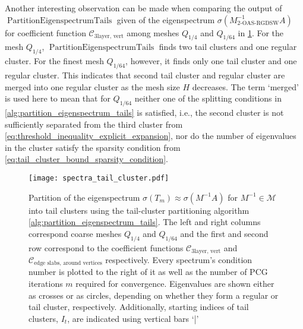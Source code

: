 Another interesting observation can be made when comparing the output of $\operatorname{PartitionEigenspectrumTails}$ given of the eigenspectrum $\sigma(M_{\text{2-OAS-RGDSW}}^{-1}A)$ for coefficient function $\mathcal{C}_{\text{3layer, vert}}$ among meshes $Q_{1/4}$ and $Q_{1/64}$ in \cref{fig:partitioning_eigenspectrum_tails}. For the mesh $Q_{1/4}$, $\operatorname{PartitionEigenspectrumTails}$ finds two tail clusters and one regular cluster. For the finest mesh $Q_{1/64}$, however, it finds only one tail cluster and one regular cluster. This indicates that second tail cluster and regular cluster are merged into one regular cluster as the mesh size $H$ decreases. The term `merged' is used here to mean that for $Q_{1/64}$ neither one of the splitting conditions in \cref{alg:partition_eigenspectrum_tails} is satisfied, i.e., the second cluster is not sufficiently separated from the third cluster from \cref{eq:threshold_inequality_explicit_expansion}, nor do the number of eigenvalues in the cluster satisfy the sparsity condition from \cref{eq:tail_cluster_bound_sparsity_condition}. 
\begin{figure}[H]
    \centering
    \texttt{[image: spectra\_tail\_cluster.pdf]}
    \caption{Partition of the eigenspectrum $\sigma(T_m)\approx\sigma(M^{-1}A)$ for $M^{-1}\in\mathcal{M}$ into tail clusters using the tail-cluster partitioning algorithm \cref{alg:partition_eigenspectrum_tails}. The left and right columns correspond coarse meshes $Q_{1/4}$ and $Q_{1/64}$ and the first and second row correspond to the coefficient functions $\mathcal{C}_{\text{3layer, vert}}$ and $\mathcal{C}_{\text{edge slabs, around vertices}}$ respectively. Every spectrum's condition number is plotted to the right of it as well as the number of PCG iterations $m$ required for convergence. Eigenvalues are shown either as crosses or as circles, depending on whether they form a regular or tail cluster, respectively. Additionally, starting indices of tail clusters, $I_t$, are indicated using vertical bars `|'}
    \label{fig:partitioning_eigenspectrum_tails}
\end{figure}

